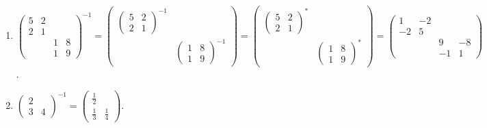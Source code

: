 \begin{enumerate}
			 \item %
			       $\begin{pmatrix}
					       5 & 2 &   &   \\
					       2 & 1 &   &   \\
					         &   & 1 & 8 \\
					         &   & 1 & 9
				       \end{pmatrix}^{-1} = \begin{pmatrix}
					       \begin{pmatrix}
						       5 & 2 \\
						       2 & 1
					       \end{pmatrix}^{-1} &                    \\
					                          & \begin{pmatrix}
						                            1 & 8 \\
						                            1 & 9
					                            \end{pmatrix}^{-1}
				       \end{pmatrix} = \begin{pmatrix}
					       \begin{pmatrix}
						       5 & 2 \\
						       2 & 1
					       \end{pmatrix}^{*} &                   \\
					                         & \begin{pmatrix}
						                           1 & 8 \\
						                           1 & 9
					                           \end{pmatrix}^{*}
				       \end{pmatrix} = \begin{pmatrix}
					       1  & -2 &    &    \\
					       -2 & 5  &    &    \\
					          &    & 9  & -8 \\
					          &    & -1 & 1
				       \end{pmatrix}$.

			 \item %
			       $\begin{pmatrix}
					       2 &   \\
					       3 & 4
				       \end{pmatrix}^{-1} = \begin{pmatrix}
					       \frac{1}{2} &             \\
					       \frac{1}{3} & \frac{1}{4}
				       \end{pmatrix}$.
		 \end{enumerate}


